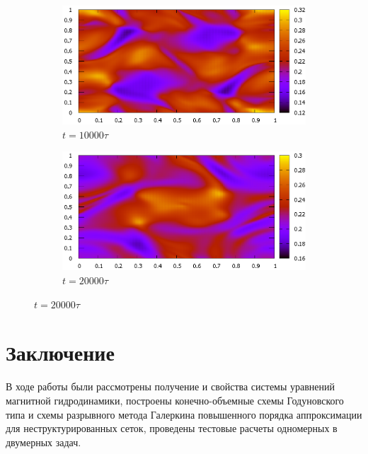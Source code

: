 \documentclass[14pt, a4paper, fleqn]{extreport}
\begin{document}
	\begin{figure}[H]
		\centering
		\caption{$\rho$.}
		\begin{subfigure}{0.9\textwidth}
			\centering
			\caption{$t = 10000\tau$}
			\includegraphics[width=\textwidth]{2D_HLLC_OT_10000.eps}
		\end{subfigure}
		\begin{subfigure}{0.9\textwidth}
			\centering
			\caption{$t = 20000\tau$}
			\includegraphics[width=\textwidth]{2D_HLLC_OT_20000.eps}
		\end{subfigure}
	\end{figure}
	
	\chapter*{Заключение}
	
	В ходе работы были рассмотрены получение и свойства системы уравнений магнитной 
	гидродинамики, построены конечно-объемные схемы Годуновского типа
	и схемы разрывного метода Галеркина повышенного порядка аппроксимации
	для неструктурированных сеток, проведены тестовые расчеты
	одномерных в двумерных задач.
	
\end{document}

